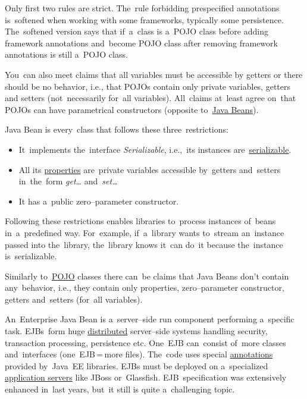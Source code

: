 \warning Only first two rules are strict.
The~rule forbidding prespecified annotations is~softened when working with some frameworks, typically some persistence.
The~softened version says that if~a~class is a~POJO class before adding framework annotations and~become POJO class after removing framework annotations is still a~POJO class.

\warning You~can also meet claims that all variables must be accessible by getters or there should be no behavior, i.e., that POJOs contain only private variables, getters and setters (not~necessarily for~all variables).
All~claims at~least agree on~that POJOs can have parametrical constructors (opposite to~\hyperref[javabeans]{Java Beans}).

\label{javabeans}
Java Bean is every~class that follows these three~restrictions:
\begin{itemize}
    \item It~implements the~interface \textit{Serializable}, i.e.,~its instances are~\hyperref[serialization]{serializable}.
    \item All its \hyperref[variablefieldproperty]{properties} are~private variables accessible by~getters and~setters in~the~form \textit{get\dots} and~\textit{set\dots}
    \item It has a~public zero--parameter constructor.
\end{itemize}
\noindent Following these restrictions enables libraries to~process instances of~beans in~a~predefined way.
For~example, if~a~library wants to~stream an~instance passed into the~library, the~library knows it~can do~it because the~instance is~serializable.

\warning Similarly to~\hyperref[pojo]{POJO} classes there can~be claims that Java Beans don't contain any~behavior, i.e., they contain only properties, zero--parameter constructor, getters and~setters (for~all variables).

\label{ejb}
An~Enterprise Java Bean is a~server--side run component performing a~specific task.
EJBs~form huge \hyperref[distributedsystem]{distributed} server--side systems handling security, transaction processing, persistence etc.
One~EJB can~consist of~more classes and~interfaces (one~EJB\,=\,more files).
The~code uses special \hyperref[annotations]{annotations} provided by~Java~EE libraries.
EJBs must be deployed on a~specialized \hyperref[applicationserver]{application servers} like JBoss or~Glassfish.
EJB~specification was extensively enhanced in~last years, but~it still is quite a~challenging topic.

